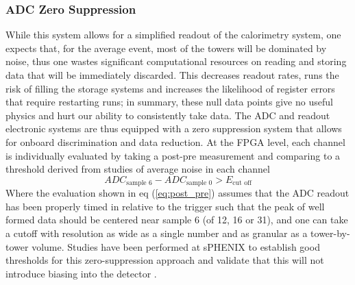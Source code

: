 		\subsubsection{ADC Zero Suppression}
			\label{sec:zero_supr}
			While this system allows for a simplified readout of the calorimetry system, one expects that, for the average event, most of the towers will be dominated by noise, thus one wastes significant computational resources on reading and storing data that will be immediately discarded.
			This decreases readout rates, runs the risk of filling the storage systems and increases the likelihood of register errors that require restarting runs; in summary, these null data points give no useful physics and hurt our ability to consistently take data. 
			The ADC and readout electronic systems are thus equipped with a zero suppression system that allows for onboard discrimination and data reduction. 
			At the FPGA level, each channel is individually evaluated by taking a post-pre measurement and comparing to a threshold derived from studies of average noise in each channel
			\begin{equation}
				ADC_{\textrm{sample 6}} - ADC_{\textrm{sample 0}} > E_{\textrm{cut off}}
				\label{eq:post_pre}
			\end{equation}
			Where the evaluation shown in eq (\ref{eq:post_pre}) assumes that the ADC readout has been properly timed in relative to the trigger such that the peak of well formed data should be centered near sample 6 (of 12, 16 or 31), and one can take a cutoff with resolution as wide as a single number and as granular as a tower-by-tower volume. 
			Studies have been performed at sPHENIX to establish good thresholds for this zero-suppression approach and validate that this will not introduce biasing into the detector \cite{Lis2020}. 
